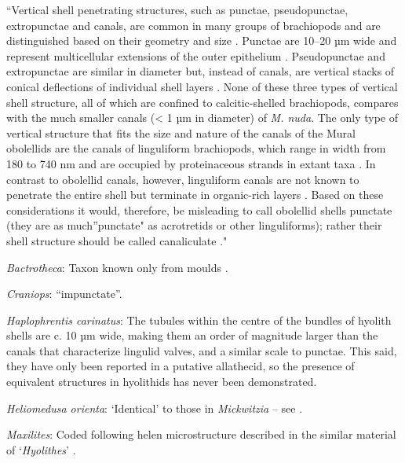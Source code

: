 \documentclass[openany]{book}
\begin{document}
``Vertical shell penetrating structures, such as punctae, pseudopunctae,
extropunctae and canals, are common in many groups of brachiopods and
are distinguished based on their geometry and size
\citep{Williams1997Introduction}. Punctae are 10--20 µm wide and
represent multicellular extensions of the outer epithelium
\citep{Owen1969Thecaecum}. Pseudopunctae and extropunctae are similar in
diameter but, instead of canals, are vertical stacks of conical
deflections of individual shell layers \citep{Williams1993Roleof}. None
of these three types of vertical shell structure, all of which are
confined to calcitic-shelled brachiopods, compares with the much smaller
canals (\textless{} 1 µm in diameter) of \emph{M. nuda}. The only type
of vertical structure that fits the size and nature of the canals of the
Mural obolellids are the canals of linguliform brachiopods, which range
in width from 180 to 740 nm and are occupied by proteinaceous strands in
extant taxa
\citep{Williams1992Structureof, Williams1994Collagenouschitino, Williams1997Introduction}.
In contrast to obolellid canals, however, linguliform canals are not
known to penetrate the entire shell but terminate in organic-rich layers
\citep{Williams1997Introduction}. Based on these considerations it
would, therefore, be misleading to call obolellid shells punctate (they
are as much''punctate" as acrotretids or other linguliforms); rather
their shell structure should be called canaliculate
\citep{Williams1997Introduction}."

\hypertarget{Bactrotheca-coding-137}{}
\emph{Bactrotheca}: Taxon known only from moulds \citep{Valent2012}.

\hypertarget{Craniops-coding-137}{}
\emph{Craniops}: ``impunctate''.

\hypertarget{Haplophrentis_carinatus-coding-137}{}
\emph{Haplophrentis carinatus}: The tubules within the centre of the
bundles of hyolith shells \citep{Kouchinsky2000Skeletalmicrostructures}
are c. 10 µm wide, making them an order of magnitude larger than the
canals that characterize lingulid valves, and a similar scale to
punctae. This said, they have only been reported in a putative
allathecid, so the presence of equivalent structures in hyolithids has
never been demonstrated.

\hypertarget{Heliomedusa_orienta-coding-137}{}
\emph{Heliomedusa orienta}: `Identical' to those in \emph{Mickwitzia} --
see \citet{Williams2007Supplement}.

\hypertarget{Maxilites-coding-137}{}
\emph{Maxilites}: Coded following helen microstructure described in the
similar material of `\emph{Hyolithes}' \citep{MartiMus2007}.
\end{document}
